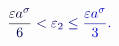 \documentclass[12pt]{article}
\begin{document}
\makeatletter
\renewcommand*{\@textcolor}[3]{%
  \protect\leavevmode
  \begingroup
    \color#1{#2}#3%
  \endgroup
}
\makeatother
\begin{displaymath}
\mathcolor[RGB]{0,0,15}{\frac { \mathcolor[RGB]{0,0,30}{\varepsilon} \mathcolor[RGB]{0,0,45}{a} ^ { \mathcolor[RGB]{0,0,60}{\sigma} } } { \mathcolor[RGB]{0,0,75}{6} } } \mathcolor[RGB]{0,0,90}{<} \mathcolor[RGB]{0,0,105}{\varepsilon} _ { \mathcolor[RGB]{0,0,120}{2} } \mathcolor[RGB]{0,0,135}{\leq} \mathcolor[RGB]{0,0,150}{\frac { \mathcolor[RGB]{0,0,165}{\varepsilon} \mathcolor[RGB]{0,0,180}{a} ^ { \mathcolor[RGB]{0,0,195}{\sigma} } } { \mathcolor[RGB]{0,0,210}{3} } } \mathcolor[RGB]{0,0,225}{.}
\end{displaymath}
\end{document}
